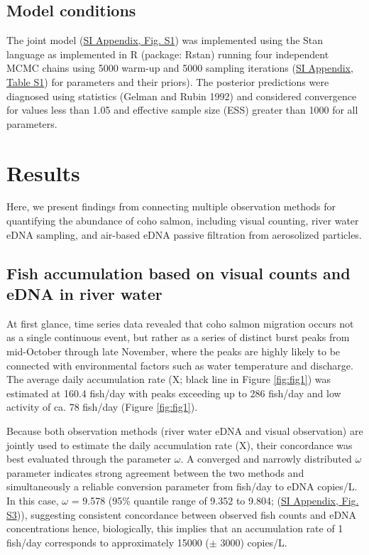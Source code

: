 \documentclass{article}
\begin{document}
\subsection{Model conditions}

The joint model (\href{SI_Appendix.pdf}{SI Appendix, Fig. S1}) was implemented using the Stan language as implemented in R (package: Rstan) running four independent MCMC chains using 5000 warm-up and 5000 sampling iterations (\href{SI_Appendix.pdf}{SI Appendix, Table S1}) for parameters and their priors). The posterior predictions were diagnosed using statistics (Gelman and Rubin 1992) and considered convergence for values less than 1.05 and effective sample size (ESS) greater than 1000 for all parameters.

\section{Results}
Here, we present findings from connecting multiple observation methods for quantifying the abundance of coho salmon, including visual counting, river water eDNA sampling, and air-based eDNA passive filtration from aerosolized particles.

\subsection{Fish accumulation based on visual counts and eDNA in river water}
At first glance, time series data revealed that coho salmon migration occurs not as a single continuous event, but rather as a series of distinct burst peaks from mid-October through late November, where the peaks are highly likely to be connected with environmental factors such as water temperature and discharge. The average daily accumulation rate (X; black line in Figure \ref{fig:fig1}) was estimated at 160.4 fish/day with peaks exceeding up to 286 fish/day and low activity of ca. 78 fish/day (Figure \ref{fig:fig1}).


Because both observation methods (river water eDNA and visual observation) are jointly used to estimate the daily accumulation rate (X), their concordance was best evaluated through the parameter $\omega$. A converged and narrowly distributed $\omega$ parameter indicates strong agreement between the two methods and simultaneously a reliable conversion parameter from fish/day to eDNA copies/L. In this case, $\omega$ = 9.578 (95\% quantile range of 9.352 to 9.804; (\href{SI_Appendix.pdf}{SI Appendix, Fig. S3})), suggesting consistent concordance between observed fish counts and eDNA concentrations hence, biologically, this implies that an accumulation rate of 1 fish/day corresponds to approximately 15000 ($\pm$ 3000) copies/L.
\end{document}

